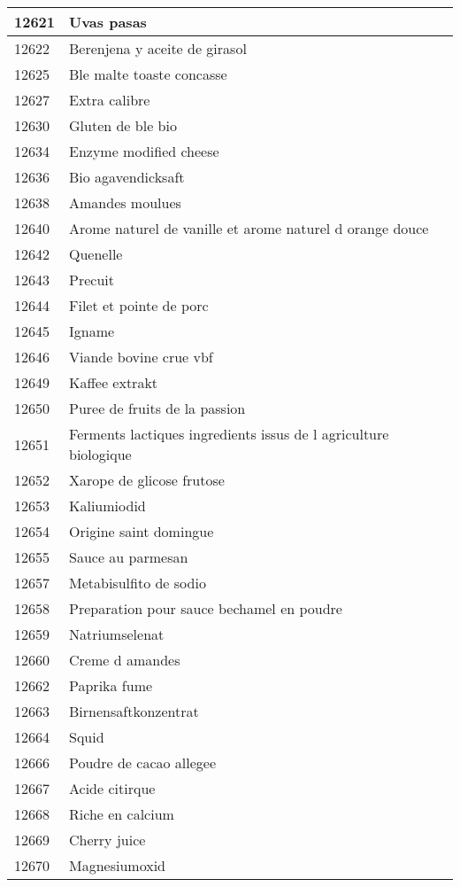 \begin{longtable}{|l|l|}
12621 & Uvas pasas \\ \hline 
12622 & Berenjena y aceite de girasol \\ \hline 
12625 & Ble malte toaste concasse \\ \hline 
12627 & Extra calibre \\ \hline 
12630 & Gluten de ble bio \\ \hline 
12634 & Enzyme modified cheese \\ \hline 
12636 & Bio agavendicksaft \\ \hline 
12638 & Amandes moulues \\ \hline 
12640 & Arome naturel de vanille et arome naturel d orange douce \\ \hline 
12642 & Quenelle \\ \hline 
12643 & Precuit \\ \hline 
12644 & Filet et pointe de porc \\ \hline 
12645 & Igname \\ \hline 
12646 & Viande bovine crue vbf \\ \hline 
12649 & Kaffee extrakt \\ \hline 
12650 & Puree de fruits de la passion \\ \hline 
12651 & Ferments lactiques  ingredients issus de l agriculture biologique \\ \hline 
12652 & Xarope de glicose frutose \\ \hline 
12653 & Kaliumiodid \\ \hline 
12654 & Origine saint domingue \\ \hline 
12655 & Sauce au parmesan \\ \hline 
12657 & Metabisulfito de sodio \\ \hline 
12658 & Preparation pour sauce bechamel en poudre \\ \hline 
12659 & Natriumselenat \\ \hline 
12660 & Creme d amandes \\ \hline 
12662 & Paprika fume \\ \hline 
12663 & Birnensaftkonzentrat \\ \hline 
12664 & Squid \\ \hline 
12666 & Poudre de cacao allegee \\ \hline 
12667 & Acide citirque \\ \hline 
12668 & Riche en calcium \\ \hline 
12669 & Cherry juice \\ \hline 
12670 & Magnesiumoxid \\ \hline 

\end{longtable}
